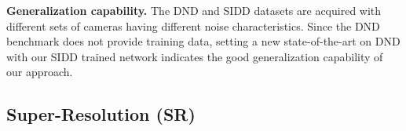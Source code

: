 \documentclass[runningheads]{llncs}
\begin{document}
\begin{table}[t]
\begin{center}
\caption{\small Super-resolution evaluation on the RealSR~\cite{RealSR} dataset. Compared to the state-of-the-art, our method consistently yields significantly better image quality scores for all three scaling factors.}
\label{table:realSR}
\setlength{\tabcolsep}{7.1pt}
\end{center}
\vspace{-1.8em}
\end{table}



\vspace{0.4em}\noindent \textbf{Generalization capability.} The DND and SIDD datasets are acquired with different sets of cameras having different noise characteristics. Since the DND benchmark does not provide training data, setting a new state-of-the-art on DND with our SIDD trained network indicates the good generalization capability of our approach. 









\subsection{Super-Resolution (SR)}
\end{document}
